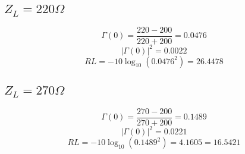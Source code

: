 \documentclass[12pt,letterpaper]{article}
\begin{document}
\subsection{$Z_L=220 \Omega$}
\begin{equation}
    \Gamma(0)=\frac{220-200}{220+200}=0.0476
\end{equation}
\begin{equation}
    |\Gamma(0)|^{2}=0.0022
\end{equation}
\begin{equation}
    RL=-10\log_{10} (0.0476^{2})=26.4478
\end{equation}

\subsection{$Z_L=270 \Omega$}
\begin{equation}
    \Gamma(0)=\frac{270-200}{270+200}=0.1489
\end{equation}
\begin{equation}
    |\Gamma(0)|^{2}=0.0221
\end{equation}
\begin{equation}
    RL=-10\log_{10} (0.1489^{2})=4.1605=16.5421
\end{equation}
\end{document}
